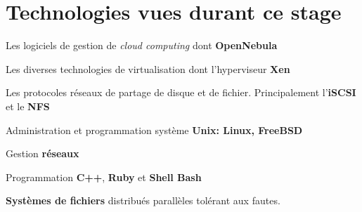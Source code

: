 \section*{Technologies vues durant ce stage}
\begin{listi}
	\item Les logiciels de gestion de \emph{cloud computing} dont \textbf{OpenNebula}\\
	\item Les diverses technologies de virtualisation dont l'hyperviseur \textbf{Xen}\\
	\item Les protocoles réseaux de partage de disque et de fichier. Principalement l'\textbf{iSCSI} et le \textbf{NFS}\\
	\item Administration et programmation système \textbf{Unix: Linux, FreeBSD}\\
	\item Gestion \textbf{réseaux}\\
	\item Programmation \textbf{C++}, \textbf{Ruby} et \textbf{Shell Bash}\\
	\item \textbf{Systèmes de fichiers} distribués parallèles tolérant aux fautes.
\end{listi}
